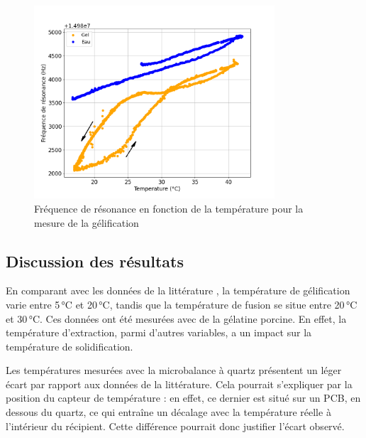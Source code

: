 \begin{figure}[H]
    \centering
    \includegraphics[width=0.8\textwidth]{assets/figures/gel.png}
    \caption{Fréquence de résonance en fonction de la température pour la mesure de la gélification}
    \label{fig:Frequence gelification}
\end{figure}

\subsection{Discussion des résultats}

En comparant avec les données de la littérature \cite{SHA2019163}, la température de gélification varie entre 5 °C et 20 °C, tandis que la température de fusion se situe entre 20 °C et 30 °C. Ces données ont été mesurées avec de la gélatine porcine. En effet, la température d’extraction, parmi d’autres variables, a un impact sur la température de solidification.

Les températures mesurées avec la microbalance à quartz présentent un léger écart par rapport aux données de la littérature. Cela pourrait s’expliquer par la position du capteur de température : en effet, ce dernier est situé sur un PCB, en dessous du quartz, ce qui entraîne un décalage avec la température réelle à l’intérieur du récipient. Cette différence pourrait donc justifier l’écart observé.


